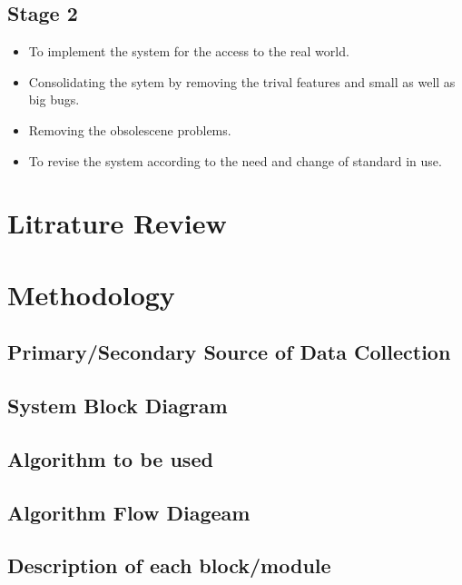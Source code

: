 \documentclass{article}
\begin{document}
\subsection{Stage 2}
\begin{itemize}
	\item To implement the system for the access to the real world.
	\item Consolidating the sytem by removing the trival features and small as well as big bugs.
	\item Removing the obsolescene problems.
	\item To revise the system according to the need and change of standard in use.
\end{itemize}

\cleardoublepage

\section{Litrature Review}
\cleardoublepage

\section{Methodology}
\cleardoublepage

\subsection{Primary/Secondary Source of Data Collection}
\cleardoublepage

\subsection{System Block Diagram}
\cleardoublepage

\subsection{Algorithm to be used}
\cleardoublepage

\subsection{Algorithm Flow Diageam}
\cleardoublepage

\subsection{Description of each block/module}
\cleardoublepage
\end{document}

